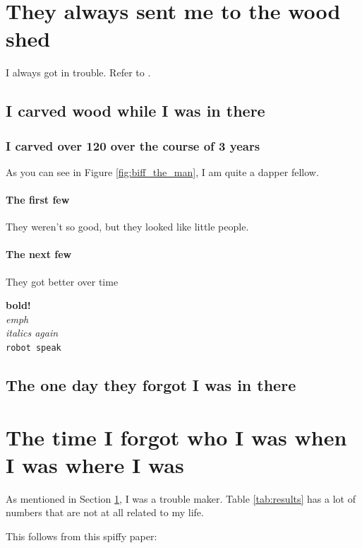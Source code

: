 \documentclass[a4paper,10pt]{article}
\begin{document}
  
  \section{They always sent me to the wood shed}
  \label{sec:birth}
  
  I always got in trouble. Refer to \cite{Kennington2014_coling}. 
  \subsection{I carved wood while I was in there}
  
  \subsubsection{I carved over 120 over the course of 3 years}
  
  As you can see in Figure \ref{fig:biff_the_man}, I am quite a dapper fellow.
  
  \paragraph{The first few} They weren't so good, but they looked like little people. 
  
  \paragraph{The next few} They got better over time
  
  \textbf{bold!}\\
  \emph{emph}\\
  \textit{italics again}\\
  \texttt{robot speak}

  
  \subsection{The one day they forgot I was in there}
  
  \section{The time I forgot who I was when I was where I was}
  \label{sec:forgot}
  
  As mentioned in Section \ref{sec:birth}, I was a trouble maker. Table \ref{tab:results} has a lot of numbers that are not at all related to my life.
  
  This follows from this spiffy paper: \cite{Schlangen2009}
  
\end{document}
